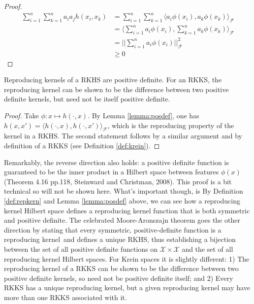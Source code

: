 \begin{proof}
	\begin{align*}
		\sum_{i=1}^n\sum_{k=1}^n a_ia_jh(x_i, x_k)	
		&= \sum_{i=1}^n\sum_{k=1}^n \langle a_i\phi(x_i), a_k\phi(x_k) \rangle_{\mathcal F} \\
		&= \Bigg\langle \sum_{i=1}^n a_i\phi(x_i), \sum_{k=1}^n a_k\phi(x_k) \Bigg\rangle_{\mathcal F} \\
		&= \Bigg|\Bigg| \sum_{i=1}^n a_i\phi(x_i) \Bigg|\Bigg|_{\mathcal F}^2 \\
		& \geq 0
	\end{align*}
\end{proof}

\begin{corollary}
	Reproducing kernels of a RKHS are positive definite. For an RKKS, the reproducing kernel can be shown to be the difference between two positive definite kernels, but need not be itself positive definite.
\end{corollary}

\begin{proof}
	Take $\phi: x \mapsto h(\cdot,x)$. By Lemma \ref{lemma:posdef}, one has $h(x,x') = \langle h(\cdot, x), h(\cdot, x') \rangle_{\mathcal F}$, which is the reproducing property of the kernel in a RKHS. The second statement follows by a similar argument and by definition of a RKKS (see Definition \ref{def:krein}).
\end{proof}

Remarkably, the reverse direction also holds: a positive definite function is guaranteed to be the inner product in a Hilbert space between features $\phi(x)$ (Theorem 4.16 pp.118, Steinward and Christman, 2008). This proof is a bit technical so will not be shown here. What's important though, is 
By Definition \ref{def:repkern} and Lemma \ref{lemma:posdef} above, we can see how a reproducing kernel Hilbert space defines a reproducing kernel function that is both symmetric and positive definite. The celebrated Moore-Aronszajn theorem goes the other direction by stating that every symmetric, positive-definite function is a reproducing kernel\footnotemark \ and defines a unique RKHS, thus establishing a bijection between the set of all positive definite functions on $\mathcal X \times \mathcal X$ and the set of all reproducing kernel Hilbert spaces. For Krein spaces it is slightly different: 1) The reproducing kernel of a RKKS can be shown to be the difference between two positive definite kernels, so need not be positive definite itself; and 2) Every RKKS has a unique reproducing kernel, but a given reproducing kernel may have more than one RKKS associated with it.

